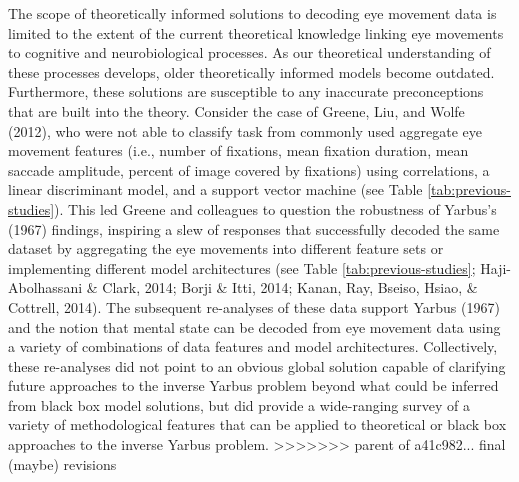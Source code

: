 \documentclass[
  english,
  man, donotrepeattitle,floatsintext]{apa6}
\begin{document}
The scope of theoretically informed solutions to decoding eye movement data is limited to the extent of the current theoretical knowledge linking eye movements to cognitive and neurobiological processes. As our theoretical understanding of these processes develops, older theoretically informed models become outdated. Furthermore, these solutions are susceptible to any inaccurate preconceptions that are built into the theory. Consider the case of Greene, Liu, and Wolfe (2012), who were not able to classify task from commonly used aggregate eye movement features (i.e., number of fixations, mean fixation duration, mean saccade amplitude, percent of image covered by fixations) using correlations, a linear discriminant model, and a support vector machine (see Table \ref{tab:previous-studies}). This led Greene and colleagues to question the robustness of Yarbus's (1967) findings, inspiring a slew of responses that successfully decoded the same dataset by aggregating the eye movements into different feature sets or implementing different model architectures (see Table \ref{tab:previous-studies}; Haji-Abolhassani \& Clark, 2014; Borji \& Itti, 2014; Kanan, Ray, Bseiso, Hsiao, \& Cottrell, 2014). The subsequent re-analyses of these data support Yarbus (1967) and the notion that mental state can be decoded from eye movement data using a variety of combinations of data features and model architectures. Collectively, these re-analyses did not point to an obvious global solution capable of clarifying future approaches to the inverse Yarbus problem beyond what could be inferred from black box model solutions, but did provide a wide-ranging survey of a variety of methodological features that can be applied to theoretical or black box approaches to the inverse Yarbus problem.
>>>>>>> parent of a41c982... final (maybe) revisions
\end{document}
